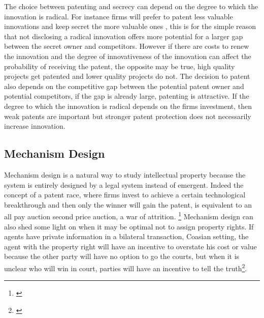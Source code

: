 \documentclass[12pt]{article}
\numberwithin{equation}{section}
\begin{document}

The choice between patenting and secrecy can depend on the degree to which the innovation is radical. For instance firms will prefer to patent less valuable innovations and keep secret the more valuable ones \cite{Anton2004} , this is for the simple reason that not disclosing a radical innovation offers more potential for a larger gap between the secret owner and competitors. However if there are costs to renew the innovation and the degree of innovativeness of the innovation can affect the probability of receiving the patent, the opposite may be true, high quality projects get patented and lower quality projects do not\cite{Mose2011}. The decision to patent also depends on the competitive gap between the potential patent owner and potential competitors, if the gap is already large, patenting is attractive. If the degree to which the innovation is radical depends on the firms investment, then weak patents are important but stronger patent protection does not necessarily increase innovation\cite{Kultti2006}. %



\subsection{Mechanism Design}

Mechanism design is a natural way to study intellectual property because the system is entirely designed by a legal system instead of emergent. Indeed the concept of a patent race, where firms invest to achieve a certain technological breakthrough and then only the winner will gain the patent, is equivalent to an all pay auction second price auction, a war of attrition. \footnote{ \cite{Games2003} } Mechanism design can also shed some light on when it may be optimal not to assign property rights. If agents have private information in a bilateral transaction, Coasian setting, the agent with the property right will have an incentive to overstate his cost or value because the other party will have no option to go the courts, but when it is unclear who will win in court, parties will have an incentive to tell the truth\footnote{\cite{schmitz2001coase}}.
\end{document}
